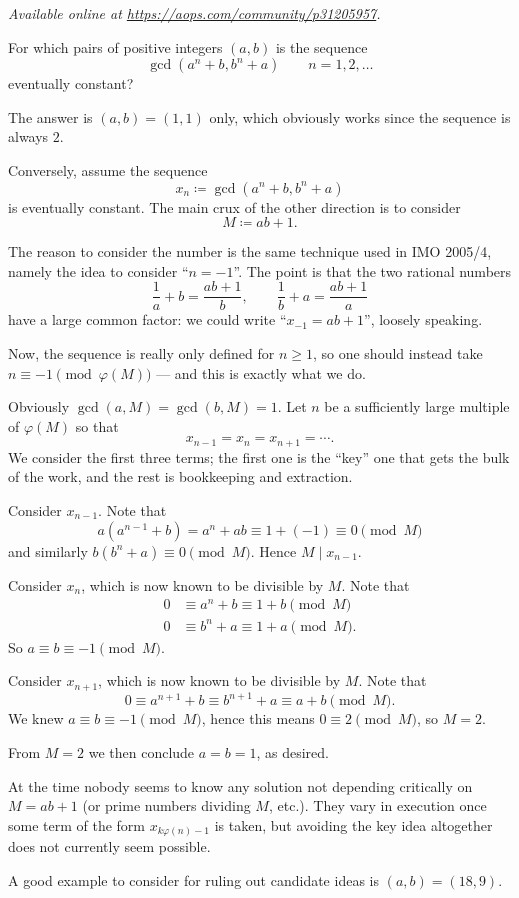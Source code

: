 \textsl{Available online at \url{https://aops.com/community/p31205957}.}
\begin{mdframed}[style=mdpurplebox,frametitle={Problem statement}]
For which pairs of positive integers $(a,b)$ is the sequence
\[ \gcd(a^n+b, b^n+a) \qquad n = 1, 2, \dotsc \]
eventually constant?
\end{mdframed}
The answer is $(a,b)=(1,1)$ only, which obviously works since the sequence is always $2$.

Conversely, assume the sequence
\[ x_n \coloneqq \gcd(a^n+b, b^n+a) \] is eventually constant.
The main crux of the other direction is to consider
\[ M \coloneqq ab+1. \]
\begin{remark*}
  [Motivation]
  The reason to consider the number is the same technique used in IMO 2005/4,
  namely the idea to consider ``$n = -1$''.
  The point is that the two rational numbers
  \[ \frac 1a + b = \frac{ab+1}{b}, \qquad \frac 1b + a = \frac{ab+1}{a} \]
  have a large common factor: we could write ``$x_{-1} = ab + 1$'', loosely speaking.

  Now, the sequence is really only defined for $n \ge 1$,
  so one should instead take $n \equiv -1 \pmod{\varphi(M)}$
  --- and this is exactly what we do.
\end{remark*}
Obviously $\gcd(a,M) = \gcd(b,M) = 1$.
Let $n$ be a sufficiently large multiple of $\varphi(M)$
so that \[ x_{n-1} = x_n = x_{n+1} = \dotsb. \]
We consider the first three terms;
the first one is the ``key'' one that gets the bulk of the work,
and the rest is bookkeeping and extraction.
\begin{itemize}
  \ii Consider $x_{n-1}$.
  Note that
  \[ a (a^{n-1} + b) = a^n + ab \equiv 1 + (-1) \equiv 0 \pmod M \]
  and similarly $b (b^n + a) \equiv 0 \pmod M$.
  Hence $M \mid x_{n-1}$.

  \ii Consider $x_n$, which is now known to be divisible by $M$. Note that
  \begin{align*}
    0 &\equiv a^n + b \equiv 1 + b \pmod M \\
    0 &\equiv b^n + a \equiv 1 + a \pmod M.
  \end{align*}
  So $a \equiv b \equiv -1 \pmod M$.

  \ii Consider $x_{n+1}$, which is now known to be divisible by $M$. Note that
  \[ 0 \equiv a^{n+1} + b \equiv b^{n+1} + a \equiv a + b \pmod M. \]
  We knew $a \equiv b \equiv -1 \pmod M$,
  hence this means $0 \equiv 2 \pmod M$, so $M = 2$.
\end{itemize}
From $M = 2$ we then conclude $a = b = 1$, as desired.

\begin{remark*}
  At the time nobody seems to know any solution not depending critically
  on $M = ab+1$ (or prime numbers dividing $M$, etc.).
  They vary in execution once some term of the form $x_{k\varphi(n)-1}$ is taken,
  but avoiding the key idea altogether does not currently seem possible.

  A good example to consider for ruling out candidate ideas is $(a,b) = (18,9)$.
\end{remark*}
\pagebreak